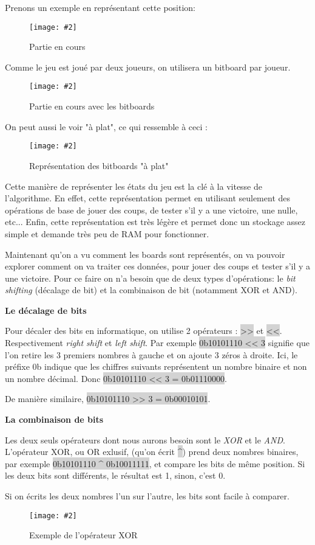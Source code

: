 \documentclass[a4paper]{article}
\newcommand{\img}[3][]{
    \begin{figure}[H]
        \centering
        \texttt{[image: \#2]}
        \caption{#1}    
    \end{figure}
}
\newcommand{\inlinecode}[1]{\colorbox{lightgray}{#1}}
\newcommand{\ptitle}[1]{\vspace{10pt}
{\large \noindent \textbf{#1}}}
\begin{document}
    Prenons un exemple en représentant cette position:
    \img[Partie en cours]{Images/ExempleBitBoardsPt1.png}{0.3}

    Comme le jeu est joué par deux joueurs, on utilisera un bitboard par joueur.
    \img[Partie en cours avec les bitboards]{Images/ExempleBitBoardsPt2.png}{0.7}
    On peut aussi le voir "à plat", ce qui ressemble à ceci :
    \img[Représentation des bitboards "à plat"]{Images/FlatBiboard.png}{1}

    Cette manière de représenter les états du jeu est la clé à la vitesse de l'algorithme. En effet, cette représentation permet en utilisant seulement des opérations de base de jouer des coups, de tester s'il y a une victoire, une nulle, etc... Enfin, cette représentation est très légère et permet donc un stockage assez simple et demande très peu de RAM pour fonctionner.

    Maintenant qu'on a vu comment les boards sont représentés, on va pouvoir explorer comment on va traiter ces données, pour jouer des coups et tester s'il y a une victoire. Pour ce faire on n'a besoin que de deux types d'opérations: le \textit{bit shifting} (décalage de bit) et la combinaison de bit (notamment XOR et AND).

    \ptitle{Le décalage de bits}

    Pour décaler des bits en informatique, on utilise 2 opérateurs : \inlinecode{>>} et \inlinecode{<<}. Respectivement \textit{right shift} et \textit{left shift}. Par exemple \inlinecode{0b10101110 << 3} signifie que l'on retire les 3 premiers nombres à gauche et on ajoute 3 zéros à droite. Ici, le préfixe 0b indique que les chiffres suivants représentent un nombre binaire et non un nombre décimal. Donc \inlinecode{0b10101110 << 3 = 0b01110000}.
   
    De manière similaire, \inlinecode{0b10101110 >> 3 = 0b00010101}.

    
    \ptitle{La combinaison de bits}

    Les deux seuls opérateurs dont nous aurons besoin sont le \textit{XOR} et le \textit{AND}. L'opérateur XOR, ou OR exlusif, (qu'on écrit \inlinecode{\^{}}) prend deux nombres binaires, par exemple \inlinecode{0b10101110 \^{} 0b10011111}, et compare les bits de même position. Si les deux bits sont différents, le résultat est 1, sinon, c'est 0.

    Si on écrits les deux nombres l'un sur l'autre, les bits sont facile à comparer.
    \img[Exemple de l'opérateur XOR]{Images/XORExemple.png}{0.15}
\end{document}
